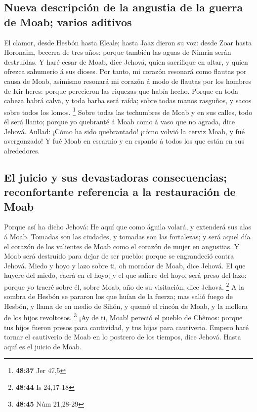 \hypertarget{nueva-descripciuxf3n-de-la-angustia-de-la-guerra-de-moab-varios-aditivos}{%
\subsection{Nueva descripción de la angustia de la guerra de Moab;
varios
aditivos}\label{nueva-descripciuxf3n-de-la-angustia-de-la-guerra-de-moab-varios-aditivos}}

 El clamor, desde Hesbón hasta Eleale; hasta Jaaz dieron
su voz: desde Zoar hasta Horonaim, becerra de tres años: porque también
las aguas de Nimrin serán destruídas.  Y haré cesar de
Moab, dice Jehová, quien sacrifique en altar, y quien ofrezca sahumerio
á sus dioses.  Por tanto, mi corazón resonará como
flautas por causa de Moab, asimismo resonará mi corazón á modo de
flautas por los hombres de Kir-heres: porque perecieron las riquezas que
había hecho.  Porque en toda cabeza habrá calva, y toda
barba será raída; sobre todas manos rasguños, y sacos sobre todos los
lomos. \footnote{\textbf{48:37} Jer 47,5}  Sobre todas
las techumbres de Moab y en sus calles, todo él será llanto; porque yo
quebranté á Moab como á vaso que no agrada, dice Jehová. 
Aullad: ¡Cómo ha sido quebrantado! ¡cómo volvió la cerviz Moab, y fué
avergonzado! Y fué Moab en escarnio y en espanto á todos los que están
en sus alrededores.

\hypertarget{el-juicio-y-sus-devastadoras-consecuencias-reconfortante-referencia-a-la-restauraciuxf3n-de-moab}{%
\subsection{El juicio y sus devastadoras consecuencias; reconfortante
referencia a la restauración de
Moab}\label{el-juicio-y-sus-devastadoras-consecuencias-reconfortante-referencia-a-la-restauraciuxf3n-de-moab}}

 Porque así ha dicho Jehová: He aquí que como águila
volará, y extenderá sus alas á Moab.  Tomadas son las
ciudades, y tomadas son las fortalezas; y será aquel día el corazón de
los valientes de Moab como el corazón de mujer en angustias.
 Y Moab será destruído para dejar de ser pueblo: porque
se engrandeció contra Jehová.  Miedo y hoyo y lazo sobre
ti, oh morador de Moab, dice Jehová.  El que huyere del
miedo, caerá en el hoyo; y el que saliere del hoyo, será preso del lazo:
porque yo traeré sobre él, sobre Moab, año de su visitación, dice
Jehová. \footnote{\textbf{48:44} Is 24,17-18}  A la
sombra de Hesbón se pararon los que huían de la fuerza; mas salió fuego
de Hesbón, y llama de en medio de Sihón, y quemó el rincón de Moab, y la
mollera de los hijos revoltosos. \footnote{\textbf{48:45} Núm 21,28-29}
 ¡Ay de ti, Moab! pereció el pueblo de Chêmos: porque tus
hijos fueron presos para cautividad, y tus hijas para cautiverio.
 Empero haré tornar el cautiverio de Moab en lo postrero
de los tiempos, dice Jehová. Hasta aquí es el juicio de Moab.

